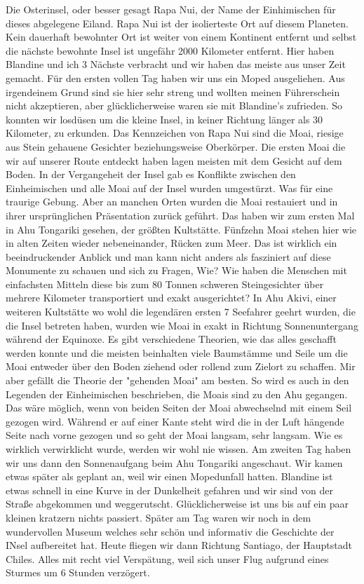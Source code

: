 \documentclass[11pt]{book}
\begin{document}
Die Osterinsel, oder besser gesagt Rapa Nui, der Name der Einhimischen für dieses abgelegene Eiland. Rapa Nui ist der isolierteste 
Ort auf diesem Planeten. Kein dauerhaft bewohnter Ort ist weiter von einem Kontinent entfernt und selbst die nächste bewohnte Insel 
ist ungefähr 2000 Kilometer entfernt. Hier haben Blandine und ich 3 Nächste verbracht und wir haben das meiste aus unser Zeit gemacht. 
Für den ersten vollen Tag haben wir uns ein Moped ausgeliehen. Aus irgendeinem Grund sind sie hier sehr streng und wollten meinen 
Führerschein nicht akzeptieren, aber glücklicherweise waren sie mit Blandine's zufrieden. So konnten wir losdüsen um die kleine Insel, 
in keiner Richtung länger als 30 Kilometer, zu erkunden. Das Kennzeichen von Rapa Nui sind die Moai, riesige aus Stein gehauene Gesichter 
beziehungsweise Oberkörper. Die ersten Moai die wir auf unserer Route entdeckt haben lagen meisten mit dem Gesicht auf dem Boden. In der 
Vergangeheit der Insel gab es Konflikte zwischen den Einheimischen und alle Moai auf der Insel wurden umgestürzt. Was für eine 
traurige Gebung. Aber an manchen Orten wurden die Moai restauiert und in ihrer ursprünglichen Präsentation zurück geführt. Das 
haben wir zum ersten Mal in Ahu Tongariki gesehen, der größten Kultstätte. Fünfzehn Moai stehen hier wie in alten Zeiten wieder 
nebeneinander, Rücken zum Meer. Das ist wirklich ein beeindruckender Anblick und man kann nicht anders als fasziniert auf diese 
Monumente zu schauen und sich zu Fragen, Wie? Wie haben die Menschen mit einfachsten Mitteln diese bis zum 80 Tonnen schweren 
Steingesichter über mehrere Kilometer transportiert und exakt ausgerichtet? In Ahu Akivi, einer weiteren Kultstätte wo wohl die 
legendären ersten 7 Seefahrer geehrt wurden, die die Insel betreten haben, wurden wie Moai in exakt in Richtung Sonnenuntergang 
während der Equinoxe. Es gibt verschiedene Theorien, wie das alles geschafft werden konnte und die meisten beinhalten viele Baumstämme 
und Seile um die Moai entweder über den Boden ziehend oder rollend zum Zielort zu schaffen. Mir aber gefällt die Theorie der 
"gehenden Moai" am besten. So wird es auch in den Legenden der Einheimischen beschrieben, die Moais sind zu den Ahu gegangen. 
Das wäre möglich, wenn von beiden Seiten der Moai abwechselnd mit einem Seil gezogen wird. Während er auf einer Kante steht 
wird die in der Luft hängende Seite nach vorne gezogen und so geht der Moai langsam, sehr langsam. Wie es wirklich verwirklicht wurde, 
werden wir wohl nie wissen. Am zweiten Tag haben wir uns dann den Sonnenaufgang beim Ahu Tongariki angeschaut. Wir kamen etwas 
später als geplant an, weil wir einen Mopedunfall hatten. Blandine ist etwas schnell in eine Kurve in der Dunkelheit gefahren und 
wir sind von der Straße abgekommen und weggerutscht. Glücklicherweise ist uns bis auf ein paar kleinen kratzern nichts passiert. 
Später am Tag waren wir noch in dem wundervollen Museum welches sehr schön und informativ die Geschichte der INsel aufbereitet hat. 
Heute fliegen wir dann Richtung Santiago, der Hauptstadt Chiles. Alles mit recht viel Verspätung, weil sich unser Flug aufgrund eines 
Sturmes um 6 Stunden verzögert. 
\end{document}
